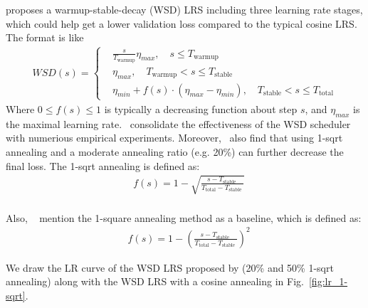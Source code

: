 \citet{hu2024minicpm} proposes a warmup-stable-decay (WSD) LRS including three learning rate stages, which could help get a lower validation loss compared to the typical cosine LRS. The format is like 
\begin{equation}
\label{eq:wsd}
\begin{aligned}
WSD(s)=\begin{cases}&
\frac{s}{T_{\text {warmup}}}\eta_{max},\quad s\leq T_{\text {warmup}}\\&
\eta_{max},\quad T_{\text {warmup}}<s\leq T_{\text {stable}}\\&
\eta_{min} + f(s)\cdot(\eta_{max}-\eta_{min}),\quad T_{\text {stable}}<s\leq T_{\text {total}}
\end{cases}
\end{aligned}
\end{equation}
Where $0 \leq f(s) \leq 1$ is typically a decreasing function about step $s$, and $\eta_{max}$ is the maximal learning rate.~\citet{hägele2024scaling} consolidate the effectiveness of the WSD scheduler with numerious empirical experiments. Moreover,~\citet{hägele2024scaling} also find that using 1-sqrt annealing and a moderate
annealing ratio (e.g. 20\%) can further decrease the final loss.
\label{apx:1-sqrt}
The 1-sqrt annealing is defined as:
\begin{equation}
\begin{aligned}
&f(s)=1-\sqrt{\frac{s-T_{\text {stable }}}{T_{\text {total}} - T_{\text {stable }}}} \\ 
\end{aligned}
\end{equation}

Also, ~\citet{hägele2024scaling} mention the 1-square annealing method as a baseline, which is defined as:
\begin{equation}
\begin{aligned}
&f(s)=1-\left({\frac{s-T_{\text {stable }}}{T_{\text {total}} - T_{\text {stable }}}}\right)^2
\end{aligned}
\end{equation}

We draw the LR curve of the WSD LRS proposed by \citet{hu2024minicpm} (20\% and 50\% 1-sqrt annealing) along with the WSD LRS with a cosine annealing in Fig.~\ref{fig:lr_1-sqrt}.